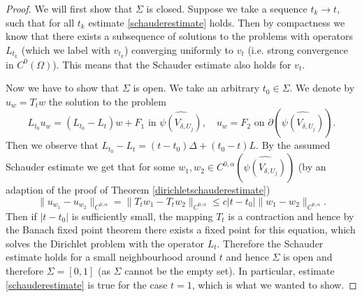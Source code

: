 \documentclass[12pt,a4paper]{article}
\theoremstyle{definition}
\theoremstyle{remark}
\numberwithin{equation}{section}
\begin{document}
\begin{appendices}
\begin{proof}
We will first show that $\Sigma$ is closed. Suppose we take a sequence $t_k \rightarrow t$, such that for all $t_k$ estimate \eqref{schauderestimate} holds. Then by compactness we know that there exists a subsequence of solutions to the problems with operators $L_{t_k}$ (which we label with $v_{t_k}$) converging uniformly to $v_{t}$ (i.e. strong convergence in $C^0 (\Omega)$). This means that the Schauder estimate also holds for $v_t$. 

Now we have to show that $\Sigma$ is open. We take an arbitrary $t_0 \in \Sigma$. We denote by $u_w = T_t w$ the solution to the problem
\begin{equation*}
L_{t_0} u_w = (L_{t_0} - L_t) w + F_1 \text{ in } \widehat{\psi(V_{\delta, U_j})}, \quad u_w = F_2 \text{ on } \partial (\widehat{\psi(V_{\delta, U_j})}).
\end{equation*}
Then we observe that $L_{t_0} - L_t = (t - t_0) \Delta + (t_0 - t) L$. By the assumed Schauder estimate we get that for some $w_1, w_2 \in C^{0,\alpha} (\widehat{\psi(V_{\delta, U_j})})$ (by an adaption of the proof of Theorem \ref{dirichletschauderestimate})
\begin{equation}
\lVert u_{w_1} - u_{w_2} \rVert_{C^{0,\alpha}} = \lVert T_t w_1 - T_t w_2 \rVert_{C^{0,\alpha}} \leq c \lvert t - t_0 \rvert \lVert w_1 - w_2 \rVert_{C^{0,\alpha}}.
\end{equation}
Then if $\lvert t - t_0 \rvert$ is sufficiently small, the mapping $T_t$ is a contraction and hence by the Banach fixed point theorem there exists a fixed point for this equation, which solves the Dirichlet problem with the operator $L_t$. Therefore the Schauder estimate holds for a small neighbourhood around $t$ and hence $\Sigma$ is open and therefore $\Sigma = [0,1]$ (as $\Sigma$ cannot be the empty set). In particular, estimate \eqref{schauderestimate} is true for the case $t=1$, which is what we wanted to show. 
\end{proof}

\end{appendices}
\end{document}
